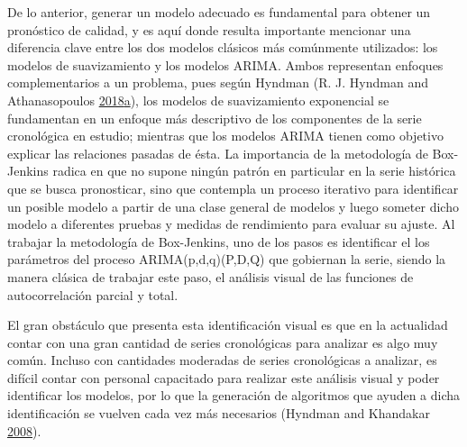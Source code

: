 \documentclass[]{article}
\begin{document}
De lo anterior, generar un modelo adecuado es fundamental para obtener
un pronóstico de calidad, y es aquí donde resulta importante mencionar
una diferencia clave entre los dos modelos clásicos más comúnmente
utilizados: los modelos de suavizamiento y los modelos ARIMA. Ambos
representan enfoques complementarios a un problema, pues según Hyndman
(R. J. Hyndman and Athanasopoulos
\protect\hyperlink{ref-hyndman2018forecasting}{2018}\protect\hyperlink{ref-hyndman2018forecasting}{a}),
los modelos de suavizamiento exponencial se fundamentan en un enfoque
más descriptivo de los componentes de la serie cronológica en estudio;
mientras que los modelos ARIMA tienen como objetivo explicar las
relaciones pasadas de ésta. La importancia de la metodología de
Box-Jenkins radica en que no supone ningún patrón en particular en la
serie histórica que se busca pronosticar, sino que contempla un proceso
iterativo para identificar un posible modelo a partir de una clase
general de modelos y luego someter dicho modelo a diferentes pruebas y
medidas de rendimiento para evaluar su ajuste. Al trabajar la
metodología de Box-Jenkins, uno de los pasos es identificar el los
parámetros del proceso ARIMA(p,d,q)(P,D,Q) que gobiernan la serie,
siendo la manera clásica de trabajar este paso, el análisis visual de
las funciones de autocorrelación parcial y total.

El gran obstáculo que presenta esta identificación visual es que en la
actualidad contar con una gran cantidad de series cronológicas para
analizar es algo muy común. Incluso con cantidades moderadas de series
cronológicas a analizar, es difícil contar con personal capacitado para
realizar este análisis visual y poder identificar los modelos, por lo
que la generación de algoritmos que ayuden a dicha identificación se
vuelven cada vez más necesarios (Hyndman and Khandakar
\protect\hyperlink{ref-auto.arima}{2008}).
\end{document}
